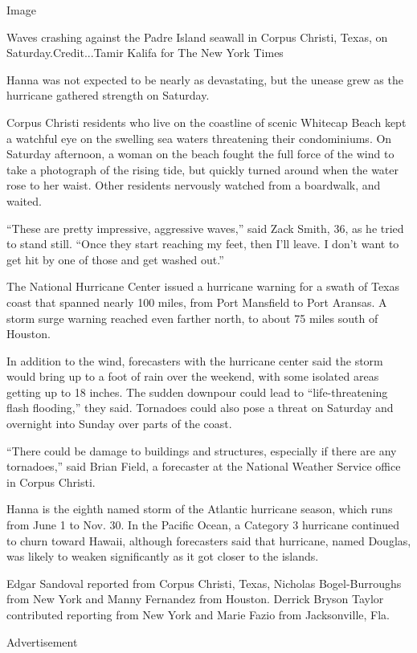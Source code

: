 Image

Waves crashing against the Padre Island seawall in Corpus Christi,
Texas, on Saturday.Credit...Tamir Kalifa for The New York Times

Hanna was not expected to be nearly as devastating, but the unease grew
as the hurricane gathered strength on Saturday.

Corpus Christi residents who live on the coastline of scenic Whitecap
Beach kept a watchful eye on the swelling sea waters threatening their
condominiums. On Saturday afternoon, a woman on the beach fought the
full force of the wind to take a photograph of the rising tide, but
quickly turned around when the water rose to her waist. Other residents
nervously watched from a boardwalk, and waited.

``These are pretty impressive, aggressive waves,'' said Zack Smith, 36,
as he tried to stand still. ``Once they start reaching my feet, then
I'll leave. I don't want to get hit by one of those and get washed
out.''

The National Hurricane Center issued a hurricane warning for a swath of
Texas coast that spanned nearly 100 miles, from Port Mansfield to Port
Aransas. A storm surge warning reached even farther north, to about 75
miles south of Houston.

In addition to the wind, forecasters with the hurricane center said the
storm would bring up to a foot of rain over the weekend, with some
isolated areas getting up to 18 inches. The sudden downpour could lead
to ``life-threatening flash flooding,'' they said. Tornadoes could also
pose a threat on Saturday and overnight into Sunday over parts of the
coast.

``There could be damage to buildings and structures, especially if there
are any tornadoes,'' said Brian Field, a forecaster at the National
Weather Service office in Corpus Christi.

Hanna is the eighth named storm of the Atlantic hurricane season, which
runs from June 1 to Nov. 30. In the Pacific Ocean, a Category 3
hurricane continued to churn toward Hawaii, although forecasters said
that hurricane, named Douglas, was likely to weaken significantly as it
got closer to the islands.

Edgar Sandoval reported from Corpus Christi, Texas, Nicholas
Bogel-Burroughs from New York and Manny Fernandez from Houston. Derrick
Bryson Taylor contributed reporting from New York and Marie Fazio from
Jacksonville, Fla.

Advertisement

